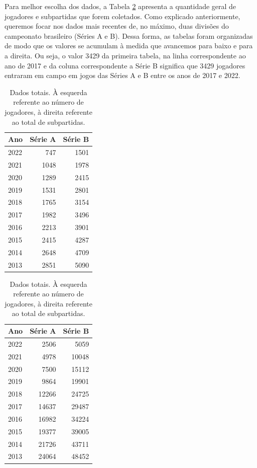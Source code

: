 Para melhor escolha dos dados, a Tabela \ref{dados_totais} apresenta a quantidade geral de jogadores e subpartidas que forem coletados. Como explicado anteriormente, queremos focar nos dados mais recentes de, no máximo, duas divisões do campeonato brasileiro (Séries A e B). Dessa forma, as tabelas foram organizadas de modo que os valores se acumulam à medida que avancemos para baixo e para a direita. Ou seja, o valor 3429 da primeira tabela, na linha correspondente ao ano de 2017 e da coluna correspondente a Série B significa que 3429 jogadores entraram em campo em jogos das Séries A e B entre os anos de 2017 e 2022.
\begin{table}[h]
    \centering
    \begin{tabular}{l|rr}
        \hline
         Ano &   Série A &   Série B \\ \hline
        2022 &       747 &      1501 \\
        2021 &      1048 &      1978 \\
        2020 &      1289 &      2415 \\
        2019 &      1531 &      2801 \\
        2018 &      1765 &      3154 \\
        2017 &      1982 &      3496 \\
        2016 &      2213 &      3901 \\
        2015 &      2415 &      4287 \\
        2014 &      2648 &      4709 \\
        2013 &      2851 &      5090 \\
    \hline
    \end{tabular}
    \hspace{50pt}
    \begin{tabular}{l|rr}
        \hline
         Ano &   Série A &   Série B \\ \hline
        2022 &      2506 &      5059 \\
        2021 &      4978 &     10048 \\
        2020 &      7500 &     15112 \\
        2019 &      9864 &     19901 \\
        2018 &     12266 &     24725 \\
        2017 &     14637 &     29487 \\
        2016 &     16982 &     34224 \\
        2015 &     19377 &     39005 \\
        2014 &     21726 &     43711 \\
        2013 &     24064 &     48452 \\
        \hline
    \end{tabular}
    \caption{Dados totais. À esquerda referente ao número de jogadores, à direita referente ao total de subpartidas.}
    \label{dados_totais}
\end{table}

